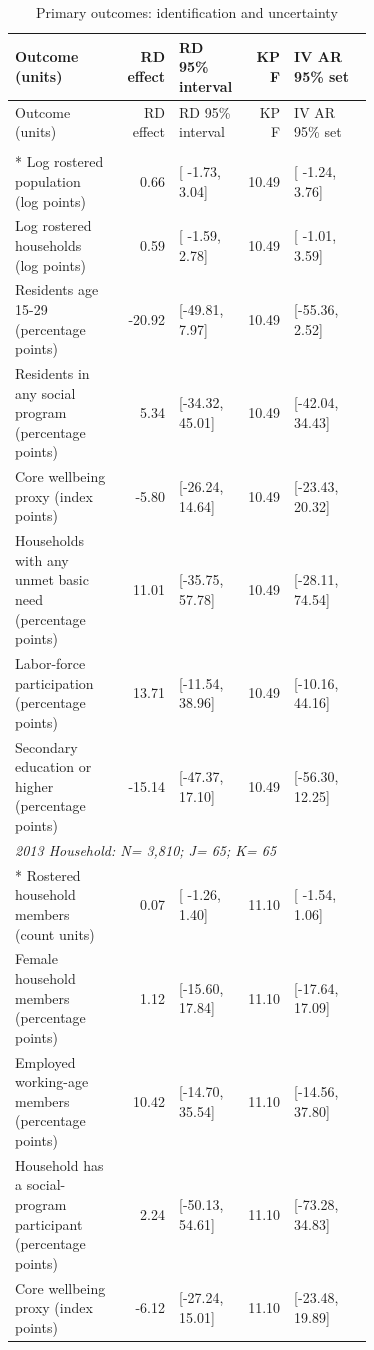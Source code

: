 \begin{longtable}{@{}p{0.30\linewidth}r p{0.19\linewidth}r p{0.22\linewidth}@{}}
\caption{Primary outcomes: identification and uncertainty}\label{tab:primary_identification_precision}\\
\toprule Outcome (units) & RD effect & RD 95\% interval & KP F & IV AR 95\% set \\
\midrule\endfirsthead
\toprule Outcome (units) & RD effect & RD 95\% interval & KP F & IV AR 95\% set \\
\midrule\endhead\bottomrule\endfoot
\multicolumn{5}{l}{\textit{2013 Community: N=       65; J=       65; K=       45}}\\*
Log rostered population (log points) &   0.66 & [ -1.73,   3.04] &  10.49 & [ -1.24,   3.76] \\
Log rostered households (log points) &   0.59 & [ -1.59,   2.78] &  10.49 & [ -1.01,   3.59] \\
Residents age 15-29 (percentage points) & -20.92 & [-49.81,   7.97] &  10.49 & [-55.36,   2.52] \\
Residents in any social program (percentage points) &   5.34 & [-34.32,  45.01] &  10.49 & [-42.04,  34.43] \\
Core wellbeing proxy (index points) &  -5.80 & [-26.24,  14.64] &  10.49 & [-23.43,  20.32] \\
Households with any unmet basic need (percentage points) &  11.01 & [-35.75,  57.78] &  10.49 & [-28.11,  74.54] \\
Labor-force participation (percentage points) &  13.71 & [-11.54,  38.96] &  10.49 & [-10.16,  44.16] \\
Secondary education or higher (percentage points) & -15.14 & [-47.37,  17.10] &  10.49 & [-56.30,  12.25] \\
\multicolumn{5}{l}{\textit{2013 Household: N=    3,810; J=       65; K=       65}}\\*
Rostered household members (count units) &   0.07 & [ -1.26,   1.40] &  11.10 & [ -1.54,   1.06] \\
Female household members (percentage points) &   1.12 & [-15.60,  17.84] &  11.10 & [-17.64,  17.09] \\
Employed working-age members (percentage points) &  10.42 & [-14.70,  35.54] &  11.10 & [-14.56,  37.80] \\
Household has a social-program participant (percentage points) &   2.24 & [-50.13,  54.61] &  11.10 & [-73.28,  34.83] \\
Core wellbeing proxy (index points) &  -6.12 & [-27.24,  15.01] &  11.10 & [-23.48,  19.89] \\

\end{longtable}
